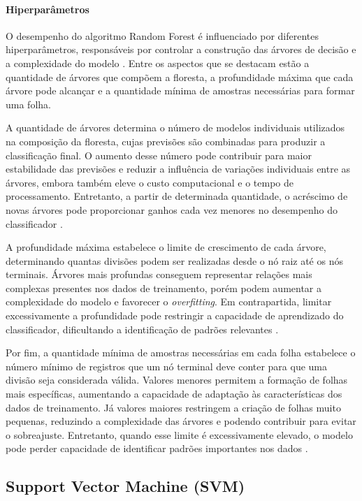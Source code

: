 \documentclass[
    12pt,                %
    openright,           %
    oneside,             %
    a4paper,             %
    english,             %
    brazil               %
]{abntex2}
\begin{document}
\paragraph{Hiperparâmetros}

O desempenho do algoritmo Random Forest é influenciado por diferentes hiperparâmetros, responsáveis por controlar a construção das árvores de decisão e a complexidade do modelo \cite{breiman2001}. Entre os aspectos que se destacam estão a quantidade de árvores que compõem a floresta, a profundidade máxima que cada árvore pode alcançar e a quantidade mínima de amostras necessárias para formar uma folha.

A quantidade de árvores determina o número de modelos individuais utilizados na composição da floresta, cujas previsões são combinadas para produzir a classificação final. O aumento desse número pode contribuir para maior estabilidade das previsões e reduzir a influência de variações individuais entre as árvores, embora também eleve o custo computacional e o tempo de processamento. Entretanto, a partir de determinada quantidade, o acréscimo de novas árvores pode proporcionar ganhos cada vez menores no desempenho do classificador \cite{becerra2025}.

A profundidade máxima estabelece o limite de crescimento de cada árvore, determinando quantas divisões podem ser realizadas desde o nó raiz até os nós terminais. Árvores mais profundas conseguem representar relações mais complexas presentes nos dados de treinamento, porém podem aumentar a complexidade do modelo e favorecer o \textit{overfitting}. Em contrapartida, limitar excessivamente a profundidade pode restringir a capacidade de aprendizado do classificador, dificultando a identificação de padrões relevantes \cite{becerra2025}.

Por fim, a quantidade mínima de amostras necessárias em cada folha estabelece o número mínimo de registros que um nó terminal deve conter para que uma divisão seja considerada válida. Valores menores permitem a formação de folhas mais específicas, aumentando a capacidade de adaptação às características dos dados de treinamento. Já valores maiores restringem a criação de folhas muito pequenas, reduzindo a complexidade das árvores e podendo contribuir para evitar o sobreajuste. Entretanto, quando esse limite é excessivamente elevado, o modelo pode perder capacidade de identificar padrões importantes nos dados \cite{becerra2025}.

\subsection{Support Vector Machine (SVM)}
\end{document}
